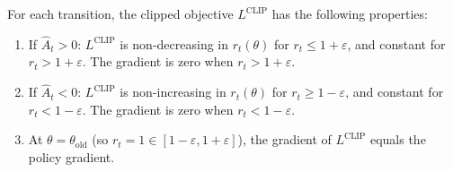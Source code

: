\begin{theorem}
\label{thm:ppo-clip-cases}
For each transition, the clipped objective $L^{\mathrm{CLIP}}$
has the following properties:
\begin{enumerate}[label=(\roman*), leftmargin=*]
  \item If $\hat{A}_t > 0$: $L^{\mathrm{CLIP}}$ is non-decreasing in
    $r_t(\theta)$ for $r_t \leq 1+\varepsilon$, and constant for
    $r_t > 1+\varepsilon$.  The gradient is zero when $r_t > 1+\varepsilon$.
  \item If $\hat{A}_t < 0$: $L^{\mathrm{CLIP}}$ is non-increasing in
    $r_t(\theta)$ for $r_t \geq 1-\varepsilon$, and constant for
    $r_t < 1-\varepsilon$.  The gradient is zero when $r_t < 1-\varepsilon$.
  \item At $\theta = \theta_\mathrm{old}$ (so $r_t = 1 \in
    [1-\varepsilon, 1+\varepsilon]$), the gradient of $L^{\mathrm{CLIP}}$
    equals the policy gradient.
\end{enumerate}
\end{theorem}

